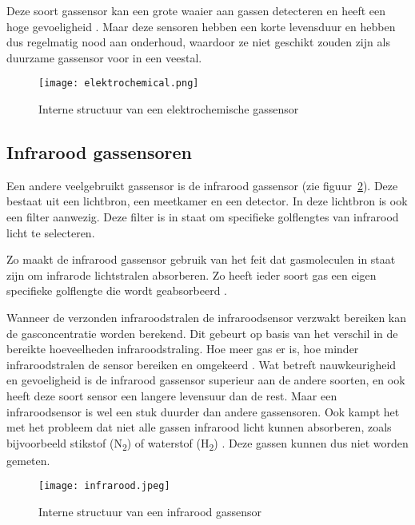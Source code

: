 Deze soort gassensor kan een grote waaier aan gassen detecteren en heeft een hoge gevoeligheid \autocite{review2014}. Maar deze sensoren hebben een korte levensduur en hebben dus regelmatig nood aan onderhoud, waardoor ze niet geschikt zouden zijn als duurzame gassensor voor in een veestal.

\begin{figure}[h]
    \texttt{[image: elektrochemical.png]}
    \caption[Structuur elektrochemisch gassensor]{Interne structuur van een elektrochemische gassensor \autocite{MajderLopatka2018}}
    \label{fig:elektrochemical}
\end{figure}



\subsection{Infrarood gassensoren}
\label{subsec:infrarood}

Een andere veelgebruikt gassensor is de infrarood gassensor (zie figuur~\ref{fig:infrarood}). Deze bestaat uit een lichtbron, een meetkamer en een detector. In deze lichtbron is ook een filter aanwezig. Deze filter is in staat om specifieke golflengtes van infrarood licht te selecteren.

Zo maakt de infrarood gassensor gebruik van het feit dat gasmoleculen in staat zijn om infrarode lichtstralen absorberen. Zo heeft ieder soort gas een eigen specifieke golflengte die wordt geabsorbeerd \autocite{li2010infrared}.

Wanneer de verzonden infraroodstralen de infraroodsensor verzwakt bereiken kan de gasconcentratie worden berekend. Dit gebeurt op basis van het verschil in de bereikte hoeveelheden infraroodstraling. Hoe meer gas er is, hoe minder infraroodstralen de sensor bereiken en omgekeerd \autocite{Senseair2018}. Wat betreft nauwkeurigheid en gevoeligheid is de infrarood gassensor superieur aan de andere soorten, en ook heeft deze soort sensor een langere levensuur dan de rest. Maar een infraroodsensor is wel een stuk duurder dan andere gassensoren. Ook kampt het met het probleem dat niet alle gassen infrarood licht kunnen absorberen, zoals bijvoorbeeld stikstof (N\textsubscript{2}) of waterstof (H\textsubscript{2}) \autocite{review2014}. Deze gassen kunnen dus niet worden gemeten.

\begin{figure}[h]
    \texttt{[image: infrarood.jpeg]}
    \caption[Structuur infrarood gassensor]{Interne structuur van een infrarood gassensor \autocite{Senseair2018}}
    \label{fig:infrarood}
\end{figure}


